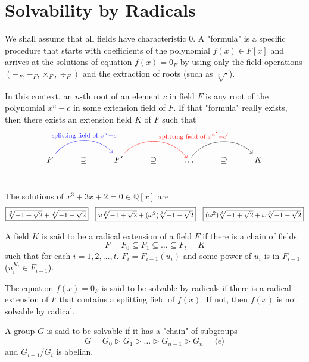 \section{Solvability by Radicals}

We shall assume that all fields have characteristic $0$. A "formula" is a specific procedure 
that starts with coefficients of the polynomial $f(x) \in F[x]$ and arrives at the solutions of equation
$f(x) = 0_F$ by using only the field operations $(+_F, -_F, \times_F, \div_F)$ and the extraction 
of roots (such as $\sqrt[n]{\cdot}$).

In this context, an $n$-th root of an element $c$ in field $F$ is any root of the polynomial 
$x^n - c$ in some extension field of $F$. If that "formula" really exists, then there exists 
an extension field $K$ of $F$ such that 
\[
    \begin{tikzcd}
        F \arrow[rr, blue, bend left=50, "\text{splitting field of } x^n - c"] & \supseteq & F' \arrow[rr, red, bend left=50, "\text{splitting field of } x^{n'} - c'"] & \supseteq & \ldots \arrow[rr, bend left=50]& \supseteq & K\\
    \end{tikzcd}
\]

\begin{example}
    The solutions of $x^3 + 3x + 2 = 0 \in \mathbb{Q}[x]$ are 
    \[
    \fbox{$\sqrt[3]{-1+\sqrt{2}} + \sqrt[3]{-1-\sqrt{2}}$} \quad \fbox{$\omega \sqrt[3]{-1+\sqrt{2}} + (\omega^2) \sqrt[3]{-1-\sqrt{2}}$}
    \quad \fbox{$(\omega^2) \sqrt[3]{-1+\sqrt{2}} + \omega \sqrt[3]{-1-\sqrt{2}}$}
    \]
\end{example}

\begin{definition}
    A field $K$ is said to be a radical extension of a field $F$ if there is a chain of fields 
    \[
        F = F_0 \subseteq F_1 \subseteq \ldots \subseteq F_t = K
    \]
    such that for each $i = 1, 2, \ldots, t$. $F_i = F_{i - 1}(u_i)$ and 
    some power of $u_i$ is in $F_{i-1}$ ($u_i^{K_{i}} \in F_{i-1}$). 
    
    The equation $f(x) = 0_F$ is said to be solvable by radicals if there is a radical extension of $F$ that contains 
    a splitting field of $f(x)$.
    If not, then $f(x)$ is not solvable by radical.
\end{definition}

\begin{definition}
    A group $G$ is said to be solvable if it has a "chain" of subgroups 
    \[
        G = G_0 \triangleright G_1 \triangleright \ldots \triangleright G_{n-1} \triangleright G_n 
        = \langle e \rangle
    \]
    and $G_{i-1} / G_i$ is abelian.
\end{definition}

